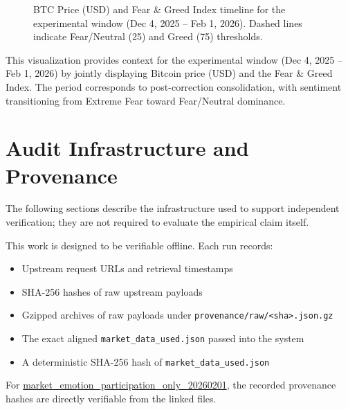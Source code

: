 \documentclass[12pt,a4paper]{article}
\begin{document}
\begin{figure}[H]
\caption{BTC Price (USD) and Fear \& Greed Index timeline for the experimental window (Dec 4, 2025 – Feb 1, 2026). Dashed lines indicate Fear/Neutral (25) and Greed (75) thresholds.}
\end{figure}

This visualization provides context for the experimental window (Dec 4, 2025 – Feb 1, 2026) by jointly displaying Bitcoin price (USD) and the Fear \& Greed Index. The period corresponds to post-correction consolidation, with sentiment transitioning from Extreme Fear toward Fear/Neutral dominance.


\section{Audit Infrastructure and Provenance}

The following sections describe the infrastructure used to support independent verification; they are not required to evaluate the empirical claim itself.

This work is designed to be verifiable offline. Each run records:

\begin{itemize}
	\item Upstream request URLs and retrieval timestamps
	\item SHA-256 hashes of raw upstream payloads
	\item Gzipped archives of raw payloads under \texttt{provenance/raw/<sha>.json.gz}
	\item The exact aligned \texttt{market\_data\_used.json} passed into the system
	\item A deterministic SHA-256 hash of \texttt{market\_data\_used.json}
\end{itemize}

For \href{https://github.com/jhcragin/SpiralBrain-v3.0-public/tree/main/Emotion-Conditioned%20Risk%20Posture%20in%20Crypto%20Markets/results}{market_emotion_participation_only_20260201}, the recorded provenance hashes are directly verifiable from the linked files.
\end{document}
